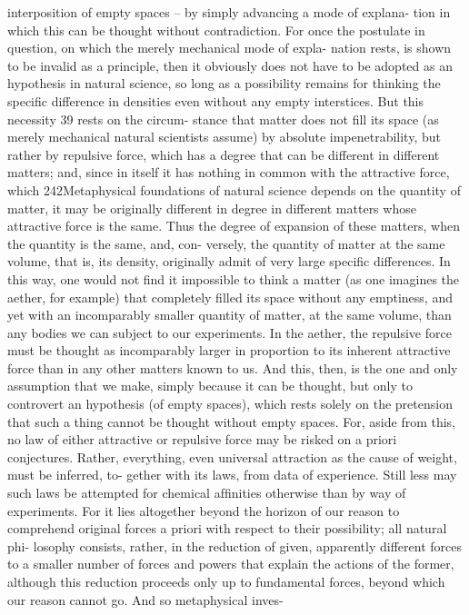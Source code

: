 interposition of empty spaces – by simply advancing a mode of explana-
tion in which this can be thought without contradiction. For once the
postulate in question, on which the merely mechanical mode of expla-
nation rests, is shown to be invalid as a principle, then it obviously does
not have to be adopted as an hypothesis in natural science, so long as a
possibility remains for thinking the speciﬁc difference in densities even
without any empty interstices. But this necessity 39 rests on the circum-
stance that matter does not ﬁll its space (as merely mechanical natural
scientists assume) by absolute impenetrability, but rather by repulsive
force, which has a degree that can be different in different matters; and,
since in itself it has nothing in common with the attractive force, which
242Metaphysical foundations of natural science
depends on the quantity of matter, it may be originally different in degree
in different matters whose attractive force is the same. Thus the degree
of expansion of these matters, when the quantity is the same, and, con-
versely, the quantity of matter at the same volume, that is, its density,
originally admit of very large speciﬁc differences. In this way, one would
not ﬁnd it impossible to think a matter (as one imagines the aether, for
example) that completely ﬁlled its space without any emptiness, and yet
with an incomparably smaller quantity of matter, at the same volume,
than any bodies we can subject to our experiments. In the aether, the
repulsive force must be thought as incomparably larger in proportion to
its inherent attractive force than in any other matters known to us. And
this, then, is the one and only assumption that we make, simply because
it can be thought, but only to controvert an hypothesis (of empty spaces),
which rests solely on the pretension that such a thing cannot be thought
without empty spaces. For, aside from this, no law of either attractive or
repulsive force may be risked on a priori conjectures. Rather, everything,
even universal attraction as the cause of weight, must be inferred, to-
gether with its laws, from data of experience. Still less may such laws be
attempted for chemical afﬁnities otherwise than by way of experiments.
For it lies altogether beyond the horizon of our reason to comprehend
original forces a priori with respect to their possibility; all natural phi-
losophy consists, rather, in the reduction of given, apparently different
forces to a smaller number of forces and powers that explain the actions
of the former, although this reduction proceeds only up to fundamental
forces, beyond which our reason cannot go. And so metaphysical inves-
